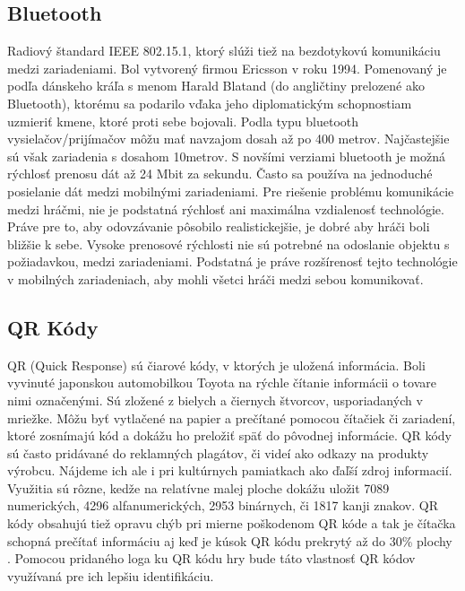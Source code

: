 \subsection{Bluetooth} Radiový štandard IEEE 802.15.1, ktorý slúži tiež na bezdotykovú komunikáciu medzi zariadeniami. Bol vytvorený firmou Ericsson v roku 1994. Pomenovaný je podľa dánskeho kráľa s menom Harald Blatand (do angličtiny prelozené ako Bluetooth), ktorému sa podarilo vďaka jeho diplomatickým schopnostiam uzmieriť kmene, ktoré proti sebe bojovali. Podla typu bluetooth vysielačov/prijímačov môžu mať navzajom dosah až po 400 metrov. Najčastejšie sú však zariadenia s dosahom 10metrov. S novšími verziami bluetooth je možná rýchlosť prenosu dát až 24 Mbit za sekundu. Často sa používa na jednoduché posielanie dát medzi mobilnými zariadeniami. Pre riešenie problému komunikácie medzi hráčmi, nie je podstatná rýchlosť ani maximálna vzdialenosť technológie. Práve pre to, aby odovzávanie pôsobilo realistickejšie, je dobré aby hráči boli bližšie k sebe. Vysoke prenosové rýchlosti nie sú potrebné na odoslanie objektu s požiadavkou, medzi zariadeniami. Podstatná je práve rozšírenosť tejto technológie v mobilných zariadeniach, aby mohli všetci hráči medzi sebou komunikovať.


\subsection{QR Kódy} QR (Quick Response) sú čiarové kódy, v ktorých je uložená informácia. Boli vyvinuté japonskou automobilkou Toyota na rýchle čítanie informácii o tovare nimi označenými. Sú zložené z bielych a čiernych štvorcov, usporiadaných v mriežke. Môžu byť vytlačené na papier a prečítané pomocou čítačiek či zariadení, ktoré zosnímajú kód a dokážu ho preložiť späť do pôvodnej informácie.  QR kódy sú často pridávané do reklamných plagátov, či videí ako odkazy na produkty výrobcu. Nájdeme ich ale i pri kultúrnych pamiatkach ako ďaľší zdroj informacií. Využitia sú rôzne, kedže na relatívne malej ploche dokážu uložit 7089 numerických, 4296 alfanumerických, 2953 binárnych, či 1817 kanji znakov\cite{qrcode-about}. QR kódy obsahujú tiež opravu chýb pri mierne poškodenom QR kóde a tak je čítačka schopná prečítať informáciu aj keď je kúsok QR kódu prekrytý až do 30\% plochy \cite{qrcode-about}. Pomocou pridaného loga ku QR kódu hry bude táto vlastnosť QR kódov využívaná pre ich lepšiu identifikáciu.

